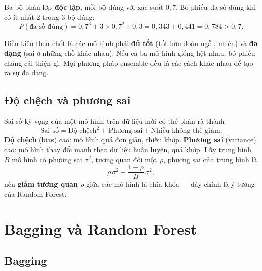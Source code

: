 \begin{example}
Ba bộ phân lớp \textbf{độc lập}, mỗi bộ đúng với xác suất $0{,}7$. Bỏ phiếu đa số đúng khi có ít nhất 2 trong 3 bộ đúng:
\begin{equation*}
    P(\text{đa số đúng}) = 0{,}7^3 + 3 \times 0{,}7^2 \times 0{,}3 = 0{,}343 + 0{,}441 = 0{,}784 > 0{,}7 .
\end{equation*}
\end{example}

Điều kiện then chốt là các mô hình phải \textbf{đủ tốt} (tốt hơn đoán ngẫu nhiên) và \textbf{đa dạng} (sai ở những chỗ khác nhau). Nếu cả ba mô hình giống hệt nhau, bỏ phiếu chẳng cải thiện gì. Mọi phương pháp ensemble đều là các cách khác nhau để tạo ra sự đa dạng.

\subsection{Độ chệch và phương sai}

Sai số kỳ vọng của một mô hình trên dữ liệu mới có thể phân rã thành
\begin{equation}
    \text{Sai số} = \text{Độ chệch}^2 + \text{Phương sai} + \text{Nhiễu không thể giảm}.
\end{equation}
\textbf{Độ chệch} (bias) cao: mô hình quá đơn giản, thiếu khớp. \textbf{Phương sai} (variance) cao: mô hình thay đổi mạnh theo dữ liệu huấn luyện, quá khớp. Lấy trung bình $B$ mô hình có phương sai $\sigma^2$, tương quan đôi một $\rho$, phương sai của trung bình là
\begin{equation}
    \rho\,\sigma^2 + \frac{1 - \rho}{B}\,\sigma^2 ,
\end{equation}
nên \textbf{giảm tương quan $\rho$} giữa các mô hình là chìa khóa --- đây chính là ý tưởng của Random Forest.


\section{Bagging và Random Forest}

\subsection{Bagging}

